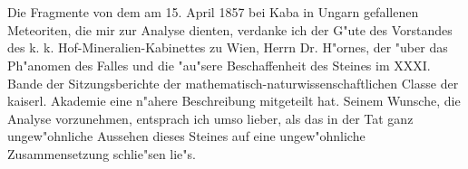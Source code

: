 \documentclass[a4paper, 11pt, oneside]{article}
\begin{document}
\setlength{\parskip}{1mm plus1mm minus1mm}
\clearpage
\tableofcontents
\clearpage
\LARGE
\pagestyle{fancy}
\fancyhf{}
\cfoot{\swabfamily{\thepage}}
\section{}
\paragraph{}
Die Fragmente von dem am 15. April 1857 bei Kaba in Ungarn gefallenen Meteoriten, die mir zur Analyse dienten, verdanke ich der G"ute des Vorstandes des k. k. Hof-Mineralien-Kabinettes zu Wien, Herrn Dr. H"ornes, der "uber das Ph"anomen des Falles und die "au"sere Beschaffenheit des Steines im XXXI. Bande der Sitzungsberichte der mathematisch-naturwissenschaftlichen Classe der kaiserl. Akademie eine n"ahere Beschreibung mitgeteilt hat. Seinem Wunsche, die Analyse vorzunehmen, entsprach ich umso lieber, als das in der Tat ganz ungew"ohnliche Aussehen dieses Steines auf eine ungew"ohnliche Zusammensetzung schlie"sen lie"s.
\end{document}
